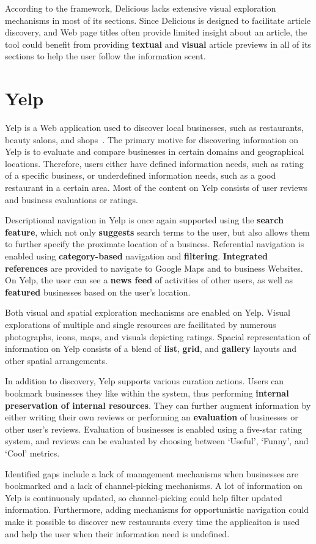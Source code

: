 {According to the framework, Delicious lacks extensive visual exploration mechanisms in most of its sections. Since Delicious is designed to facilitate article discovery, and Web page titles often provide limited insight about an article, the tool could benefit from providing \textbf{textual} and \textbf{visual} article previews in all of its sections to help the user follow the information scent. 
} %

{\section{Yelp}
Yelp is a Web application used to discover local businesses, such as restaurants, beauty salons, and shops~\cite{luca2011reviews}. The primary motive for discovering information on Yelp is to evaluate and compare businesses in certain domains and geographical locations. Therefore, users either have defined information needs, such as rating of a specific business, or underdefined information needs, such as a good restaurant in a certain area. Most of the content on Yelp consists of user reviews and business evaluations or ratings. 

Descriptional navigation in Yelp is once again supported using the \textbf{search feature}, which not only \textbf{suggests} search terms to the user, but also allows them to further specify the proximate location of a business. Referential navigation is enabled using \textbf{category-based} navigation and \textbf{filtering}. \textbf{Integrated references} are provided to navigate to Google Maps and to business Websites.  On Yelp, the user can see a \textbf{news feed} of activities of other users, as well as \textbf{featured} businesses based on the user's location. 

Both visual and spatial exploration mechanisms are enabled on Yelp. Visual explorations of multiple and single resources are facilitated by numerous photographs, icons, maps, and visuals depicting ratings. Spacial representation of information on Yelp consists of a blend of \textbf{list}, \textbf{grid}, and \textbf{gallery} layouts and other spatial arrangements.

In addition to discovery, Yelp supports various curation actions. Users can bookmark businesses they like within the system, thus performing \textbf{internal preservation of internal resources}. They can further augment information by either writing their own reviews or performing an \textbf{evaluation} of businesses or other user's reviews. Evaluation of businesses is enabled using a five-star rating system, and reviews can be evaluated by choosing between `Useful', `Funny', and `Cool' metrics. 

Identified gaps include a lack of management mechanisms when businesses are bookmarked and a lack of channel-picking mechanisms. A lot of information on Yelp is continuously updated, so channel-picking could help filter updated information. Furthermore, adding mechanisms for opportunistic navigation could make it possible to discover new restaurants every time the applicaiton is used and help the user when their information need is undefined.
 
} %

